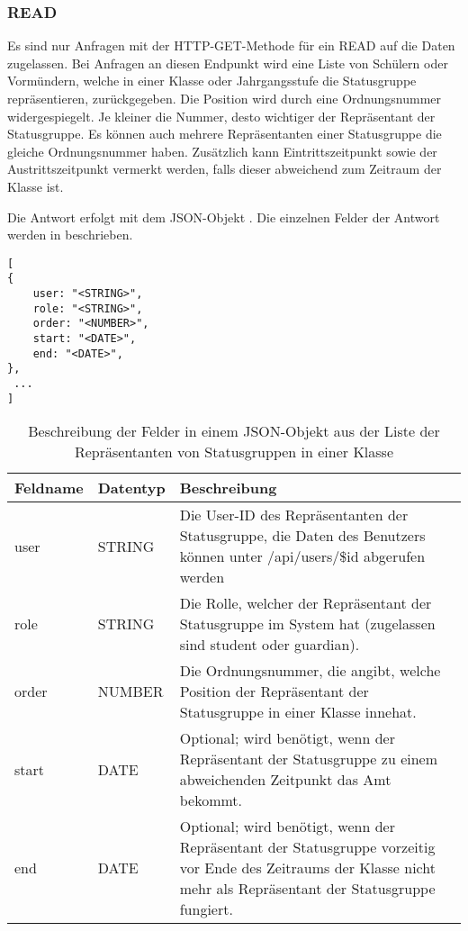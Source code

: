 \subsubsection{READ}
\label{sec:rest:api:classes:id:representatives:read}
Es sind nur Anfragen mit der HTTP-GET-Methode für ein READ auf die Daten zugelassen.
Bei Anfragen an diesen Endpunkt wird eine Liste von Schülern oder Vormündern, welche in einer Klasse oder Jahrgangsstufe die Statusgruppe repräsentieren, zurückgegeben.
Die Position wird durch eine Ordnungsnummer widergespiegelt. Je kleiner die Nummer, desto wichtiger der Repräsentant der Statusgruppe.
Es können auch mehrere Repräsentanten einer Statusgruppe die gleiche Ordnungsnummer haben.
Zusätzlich kann Eintrittszeitpunkt sowie der Austrittszeitpunkt vermerkt werden, falls dieser abweichend zum Zeitraum der Klasse ist.

Die Antwort erfolgt mit dem JSON-Objekt . 
Die einzelnen Felder der Antwort werden in  beschrieben.

\begin{lstlisting}[caption={JSON-Antwort für einen GET-Aufruf des Pfads /api/classes/\$id/representatives},label={lst:code:rest:api:classes:id:representatives:read:ret},frame=tlrb]
[ 
{ 
	user: "<STRING>",
	role: "<STRING>",
	order: "<NUMBER>",
  	start: "<DATE>",
  	end: "<DATE>",
},
 ... 
]
\end{lstlisting}

\begin{longtable}{|p{}|p{}|p{}|}
		\caption{Beschreibung der Felder in einem JSON-Objekt aus der Liste der Repräsentanten von Statusgruppen in einer Klasse}
\endfoot
		\caption{Beschreibung der Felder in einem JSON-Objekt aus der Liste der Repräsentanten von Statusgruppen in einer Klasse}
		\label{tab:rest:api:classes:id:representatives:read:ret}
\endlastfoot 
\hline
			\textbf{Feldname} & \textbf{Datentyp} & \textbf{Beschreibung} \\ \hline
\endhead
user & STRING & Die User-ID des Repräsentanten der Statusgruppe, die Daten des Benutzers können unter /api/users/\$id abgerufen werden \\ \hline
role & STRING & Die Rolle, welcher der Repräsentant der Statusgruppe im System hat (zugelassen sind student oder guardian). \\ \hline
order & NUMBER & Die Ordnungsnummer, die angibt, welche Position der Repräsentant der Statusgruppe in einer Klasse innehat. \\ \hline
start & DATE & Optional; wird benötigt, wenn der Repräsentant der Statusgruppe zu einem abweichenden Zeitpunkt das Amt bekommt. \\ \hline
end & DATE & Optional; wird benötigt, wenn der Repräsentant der Statusgruppe vorzeitig vor Ende des Zeitraums der Klasse nicht mehr als Repräsentant der Statusgruppe fungiert. \\ \hline
\end{longtable}
